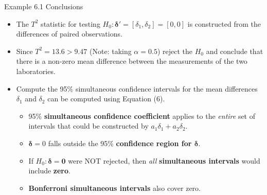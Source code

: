 \documentclass[8pt]{beamer}
\begin{document}
    \begin{frame}{Example 6.1 Conclusions}
            \begin{itemize}
                \item The $T^{2}$ statistic for testing $H_{0}:\mathbf{\delta}' = [\delta_{1},\delta_{2}] = [0,0]$ is constructed from the differences of paired observations.
                \item Since $T^{2} = 13.6 > 9.47$ (Note: taking $\alpha = 0.5$) reject the $H_{0}$ and conclude that there is a non-zero mean difference between the measurements of the two laboratories. 
                \item Compute the 95\% simultaneous confidence intervals for the mean differences $\delta_{1}$ and $\delta_{2}$ can be computed using Equation (6).
                \begin{itemize}
                    \item 95\% \textbf{simultaneous confidence coefficient} applies to the \textit{entire} set of intervals that could be constructed by $a_{1}\delta_{1} + a_{2}\delta_{2}$.
                    \item $\mathbf{\delta} = 0$ falls outside the 95\% \textbf{confidence region for $\mathbf{\delta}$}.
                    \item If $H_{0}: \mathbf{\delta = 0}$ were NOT rejected, then \textit{all} \textbf{simultaneous intervals} would include \textbf{zero}.
                    \item \textbf{Bonferroni simultaneous intervals} also cover zero.
                \end{itemize}
            
            \end{itemize}
    \end{frame}
    
\end{document}
